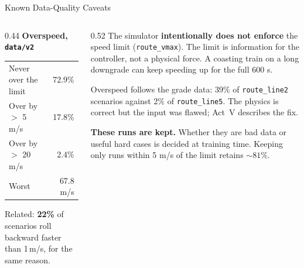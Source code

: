 \begin{frame}{Known Data-Quality Caveats}
  \vspace{0.3em}
  \begin{columns}[T,onlytextwidth]
    \begin{column}{0.44\textwidth}
      {\small\textbf{Overspeed, \texttt{data/v2}}}
      \vspace{0.4em}

      {\footnotesize
      \begin{tabular}{@{}lr@{}}
        \toprule
        Never over the limit & 72.9\% \\
        Over by $>$ 5 m/s    & 17.8\% \\
        Over by $>$ 20 m/s   & 2.4\% \\
        Worst                & 67.8 m/s \\
        \bottomrule
      \end{tabular}}

      \vspace{0.7em}
      {\footnotesize Related: \textbf{22\%} of scenarios roll backward faster
       than 1\,m/s, for the same reason.}
    \end{column}
    \begin{column}{0.52\textwidth}
      \small
      The simulator \textbf{intentionally does not enforce} the speed limit
      (\texttt{route\_vmax}). The limit is information for the controller, not a
      physical force. A coasting train on a long downgrade can keep speeding up
      for the full 600 s.

      \vspace{0.7em}
      Overspeed follows the grade data: 39\% of \texttt{route\_line2} scenarios
      against 2\% of \texttt{route\_line5}. \alert{The physics is correct but the
      input was flawed}; Act~V describes the fix.

      \vspace{0.7em}
      \textbf{These runs are kept.} Whether they are bad data or useful hard
      cases is decided at training time. Keeping only runs within 5 m/s of the
      limit retains ${\sim}81\%$.
    \end{column}
  \end{columns}
\end{frame}
